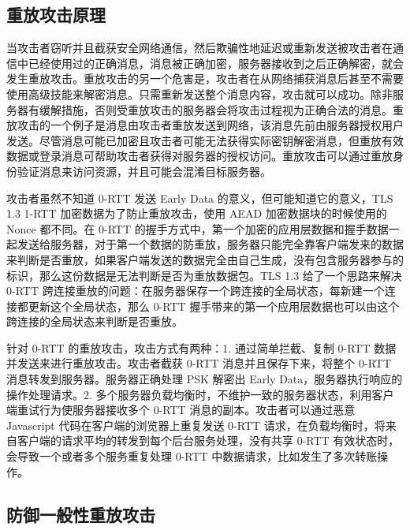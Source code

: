 \subsection{重放攻击原理}

当攻击者窃听并且截获安全网络通信，然后欺骗性地延迟或重新发送被攻击者在通信中已经使用过的正确消息，消息被正确加密，服务器接收到之后正确解密，就会发生重放攻击。重放攻击的另一个危害是，攻击者在从网络捕获消息后甚至不需要使用高级技能来解密消息。只需重新发送整个消息内容，攻击就可以成功。除非服务器有缓解措施，否则受重放攻击的服务器会将攻击过程视为正确合法的消息。重放攻击的一个例子是消息由攻击者重放发送到网络，该消息先前由服务器授权用户发送。尽管消息可能已加密且攻击者可能无法获得实际密钥解密消息，但重放有效数据或登录消息可帮助攻击者获得对服务器的授权访问。重放攻击可以通过重放身份验证消息来访问资源，并且可能会混淆目标服务器。

攻击者虽然不知道 0-RTT 发送 Early Data 的意义，但可能知道它的意义，TLS 1.3 1-RTT 加密数据为了防止重放攻击，使用 AEAD 加密数据块的时候使用的 Nonce 都不同。在 0-RTT 的握手方式中，第一个加密的应用层数据和握手数据一起发送给服务器，对于第一个数据的防重放，服务器只能完全靠客户端发来的数据来判断是否重放，如果客户端发送的数据完全由自己生成，没有包含服务器参与的标识，那么这份数据是无法判断是否为重放数据包。TLS 1.3 给了一个思路来解决 0-RTT 跨连接重放的问题：在服务器保存一个跨连接的全局状态，每新建一个连接都更新这个全局状态，那么 0-RTT 握手带来的第一个应用层数据也可以由这个跨连接的全局状态来判断是否重放。

针对 0-RTT 的重放攻击，攻击方式有两种：1. 通过简单拦截、复制 0-RTT 数据并发送来进行重放攻击。攻击者截获 0-RTT 消息并且保存下来，将整个 0-RTT 消息转发到服务器。服务器正确处理 PSK 解密出 Early Data，服务器执行响应的操作处理请求。2. 多个服务器负载均衡时，不维护一致的服务器状态，利用客户端重试行为使服务器接收多个 0-RTT 消息的副本。攻击者可以通过恶意 Javascript 代码在客户端的浏览器上重复发送 0-RTT 请求，在负载均衡时，将来自客户端的请求平均的转发到每个后台服务处理，没有共享 0-RTT 有效状态时，会导致一个或者多个服务重复处理 0-RTT 中数据请求，比如发生了多次转账操作。

\subsection{防御一般性重放攻击}

